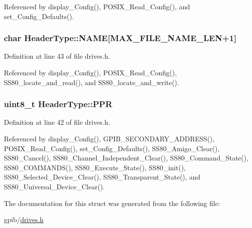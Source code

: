 Referenced by display\+\_\+\+Config(), P\+O\+S\+I\+X\+\_\+\+Read\+\_\+\+Config(), and set\+\_\+\+Config\+\_\+\+Defaults().

\subsubsection[{\texorpdfstring{N\+A\+ME}{NAME}}]{\setlength{\rightskip}{0pt plus 5cm}char Header\+Type\+::\+N\+A\+ME\mbox{[}{\bf M\+A\+X\+\_\+\+F\+I\+L\+E\+\_\+\+N\+A\+M\+E\+\_\+\+L\+EN}+1\mbox{]}}\hypertarget{structHeaderType_aac997fd2dc536b10072137ecaf1fd0b4}{}\label{structHeaderType_aac997fd2dc536b10072137ecaf1fd0b4}


Definition at line 43 of file drives.\+h.



Referenced by display\+\_\+\+Config(), P\+O\+S\+I\+X\+\_\+\+Read\+\_\+\+Config(), S\+S80\+\_\+locate\+\_\+and\+\_\+read(), and S\+S80\+\_\+locate\+\_\+and\+\_\+write().

\subsubsection[{\texorpdfstring{P\+PR}{PPR}}]{\setlength{\rightskip}{0pt plus 5cm}uint8\+\_\+t Header\+Type\+::\+P\+PR}\hypertarget{structHeaderType_ac642cdad0f3874495afa0ab687a56fd0}{}\label{structHeaderType_ac642cdad0f3874495afa0ab687a56fd0}


Definition at line 42 of file drives.\+h.



Referenced by display\+\_\+\+Config(), G\+P\+I\+B\+\_\+\+S\+E\+C\+O\+N\+D\+A\+R\+Y\+\_\+\+A\+D\+D\+R\+E\+S\+S(), P\+O\+S\+I\+X\+\_\+\+Read\+\_\+\+Config(), set\+\_\+\+Config\+\_\+\+Defaults(), S\+S80\+\_\+\+Amigo\+\_\+\+Clear(), S\+S80\+\_\+\+Cancel(), S\+S80\+\_\+\+Channel\+\_\+\+Independent\+\_\+\+Clear(), S\+S80\+\_\+\+Command\+\_\+\+State(), S\+S80\+\_\+\+C\+O\+M\+M\+A\+N\+D\+S(), S\+S80\+\_\+\+Execute\+\_\+\+State(), S\+S80\+\_\+init(), S\+S80\+\_\+\+Selected\+\_\+\+Device\+\_\+\+Clear(), S\+S80\+\_\+\+Transparent\+\_\+\+State(), and S\+S80\+\_\+\+Universal\+\_\+\+Device\+\_\+\+Clear().



The documentation for this struct was generated from the following file\+:\begin{DoxyCompactItemize}
\item 
gpib/\hyperlink{drives_8h}{drives.\+h}\end{DoxyCompactItemize}

